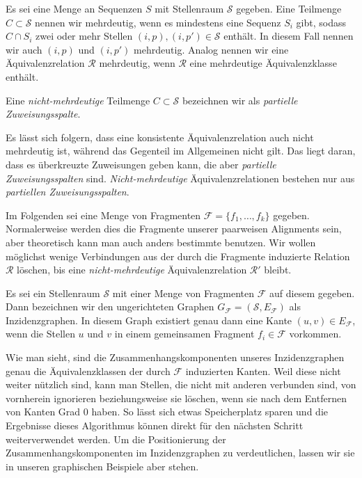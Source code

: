 \begin{definition}
	Es sei eine Menge an Sequenzen $S$ mit Stellenraum $\mathcal{S}$ gegeben. Eine Teilmenge $C \subset \mathcal{S}$ nennen wir mehrdeutig, wenn es mindestens eine Sequenz $S_i$ gibt, sodass $C \cap S_i$ zwei oder mehr Stellen $(i,p), (i,p') \in \mathcal{S}$ enthält. In diesem Fall nennen wir auch $(i,p)$ und $(i,p')$ mehrdeutig. Analog nennen wir eine Äquivalenzrelation $\mathcal{R}$ mehrdeutig, wenn $\mathcal{R}$ eine mehrdeutige Äquivalenzklasse enthält.
	
	Eine \emph{nicht-mehrdeutige} Teilmenge $C \subset \mathcal{S}$ bezeichnen wir als \emph{partielle Zuweisungsspalte}.
\end{definition}

Es lässt sich folgern, dass eine konsistente Äquivalenzrelation auch nicht mehrdeutig ist, während das Gegenteil im Allgemeinen nicht gilt. Das liegt daran, dass es überkreuzte Zuweisungen geben kann, die aber \emph{partielle Zuweisungsspalten} sind. \emph{Nicht-mehrdeutige} Äquivalenzrelationen bestehen nur aus \emph{partiellen Zuweisungsspalten}.

Im Folgenden sei eine Menge von Fragmenten $\mathcal{F} = \{f_1, \dots, f_k\}$ gegeben. Normalerweise werden dies die Fragmente unserer paarweisen Alignments sein, aber theoretisch kann man auch anders bestimmte benutzen. Wir wollen möglichst wenige Verbindungen aus der durch die Fragmente induzierte Relation $\mathcal{R}$ löschen, bis eine \emph{nicht-mehrdeutige} Äquivalenzrelation $\mathcal{R'}$ bleibt.

\begin{definition}[Inzidenzgraph]
	Es sei ein Stellenraum $\mathcal{S}$ mit einer Menge von Fragmenten $\mathcal{F}$ auf diesem gegeben. Dann bezeichnen wir den ungerichteten Graphen $G_{\mathcal{F}} = (\mathcal{S},E_{\mathcal{F}})$ als Inzidenzgraphen. In diesem Graph existiert genau dann eine Kante $(u,v) \in E_{\mathcal{F}}$, wenn die Stellen $u$ und $v$ in einem gemeinsamen Fragment $f_i \in \mathcal{F}$ vorkommen.
\end{definition} 

Wie man sieht, sind die Zusammenhangskomponenten unseres Inzidenzgraphen genau die Äquivalenzklassen der durch $\mathcal{F}$ induzierten Kanten. Weil diese nicht weiter nützlich sind, kann man Stellen, die nicht mit anderen verbunden sind, von vornherein ignorieren beziehungsweise sie löschen, wenn sie nach dem Entfernen von Kanten Grad 0 haben. So lässt sich etwas Speicherplatz sparen und die Ergebnisse dieses Algorithmus können direkt für den nächsten Schritt weiterverwendet werden. Um die Positionierung der Zusammenhangskomponenten im Inzidenzgraphen zu verdeutlichen, lassen wir sie in unseren graphischen Beispiele aber stehen.

